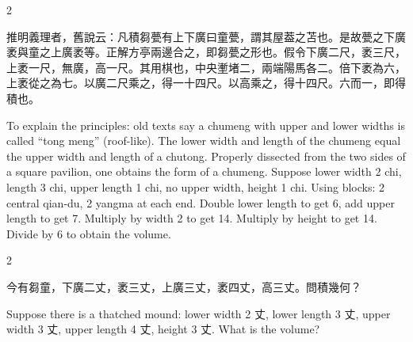\documentclass[10pt,a4paper]{article}
\begin{document}
\begin{paracol}{2}

\begin{leftcolumn*}
\begin{commentarybi}
推明義理者，舊說云：凡積芻甍有上下廣曰童甍，謂其屋葢之苫也。是故甍之下廣袤與童之上廣袤等。正解方亭兩邊合之，即芻甍之形也。假令下廣二尺，袤三尺，上袤一尺，無廣，高一尺。其用棋也，中央壍堵二，兩端陽馬各二。倍下袤為六，上袤從之為七。以廣二尺乘之，得一十四尺。以高乘之，得十四尺。六而一，即得積也。
\end{commentarybi}
\end{leftcolumn*}

\begin{rightcolumn*}
\begin{commentarybi}
To explain the principles: old texts say a chumeng with upper and lower widths is called ``tong meng'' (roof-like). The lower width and length of the chumeng equal the upper width and length of a chutong. Properly dissected from the two sides of a square pavilion, one obtains the form of a chumeng. Suppose lower width 2 chi, length 3 chi, upper length 1 chi, no upper width, height 1 chi. Using blocks: 2 central qian-du, 2 yangma at each end. Double lower length to get 6, add upper length to get 7. Multiply by width 2 to get 14. Multiply by height to get 14. Divide by 6 to obtain the volume.
\end{commentarybi}
\end{rightcolumn*}

\end{paracol}

\vspace{0.2cm}

\begin{paracol}{2}

\begin{leftcolumn*}
\begin{problembi}[\textbf{問} · 芻童]
今有芻童，下廣二丈，袤三丈，上廣三丈，袤四丈，高三丈。問積幾何？
\end{problembi}
\end{leftcolumn*}

\begin{rightcolumn*}
\begin{problembi}
Suppose there is a thatched mound: lower width 2 丈, lower length 3 丈, upper width 3 丈, upper length 4 丈, height 3 丈. What is the volume?
\end{problembi}
\end{rightcolumn*}

\end{paracol}
\end{document}
